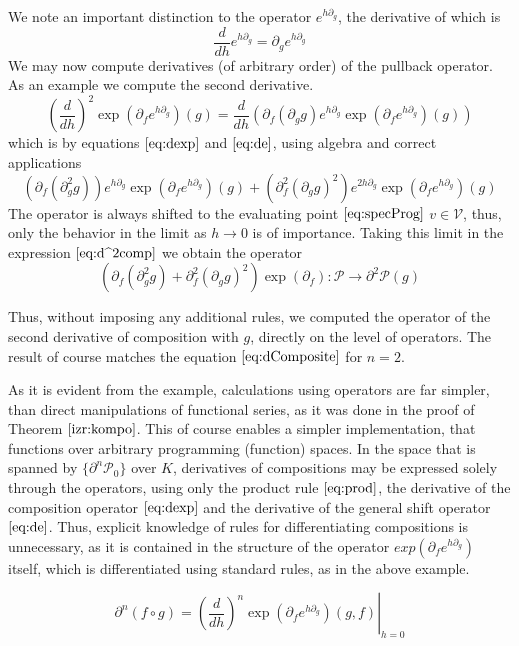 \documentclass[smallcondensed]{svjour3}
\newcommand{\VV}{\mathcal{V}}
\newcommand{\dP}{\mathcal{P}}
\newcommand{\D}{\partial}
\begin{document}
 We note an important distinction to the operator $e^{h\D_g}$, the derivative of which is
 \begin{equation}\label{eq:de}
\frac{d}{dh}e^{h\D_g}=\D_ge^{h\D_g}
 \end{equation}
 We may now compute derivatives (of arbitrary order) of the pullback operator. As an example we compute the second derivative.
 $$\left(\frac{d}{dh}\right)^2\exp\left(\D_fe^{h\D_g}\right)(g)=\frac{d}{dh}\left(\D_f(\D_gg)e^{h\D_g}\exp\left(\D_fe^{h\D_g}\right)(g)\right)$$
 which is by equations $\eqref{eq:dexp}$ and $\eqref{eq:de}$, using algebra and correct applications
 \begin{equation}\label{eq:d^2comp}
 \left(\D_f(\D^2_gg)\right)e^{h\D_g}\exp(\D_fe^{h\D_g})(g)+(\D^2_f(\D_gg)^2)e^{2h\D_g}\exp(\D_fe^{h\D_g})(g)
 \end{equation}
 The operator is always shifted to the evaluating point $\eqref{eq:specProg}$ $v\in \VV$, thus, only the behavior in the limit as $h\to 0$ is of importance. Taking this limit in the expression $\eqref{eq:d^2comp}$ we obtain the operator
 \begin{equation}
	\left(\D_f(\D^2_gg)+\D^2_f(\D_gg)^2\right)\exp(\D_f):\dP\to\D^2\dP(g)
 \end{equation}
 
 Thus, without imposing any additional rules, we computed the operator of the second derivative of composition with $g$, directly on the level of operators. The result of course matches the equation $\eqref{eq:dComposite}$ for $n=2$.
 
 As it is evident from the example, calculations using operators are far
 simpler, than direct manipulations of functional series, as it was done in the
 proof of Theorem $\ref{izr:kompo}$. This of course enables a simpler
 implementation, that functions over arbitrary programming (function) spaces. In
 the space that is spanned by $\{\D^n\dP_0\}$ over $K$, derivatives of
 compositions may be expressed solely through the operators, using only the
 product rule $\eqref{eq:prod}$, the derivative of the composition operator
 $\eqref{eq:dexp}$ and the derivative of the general shift operator
 $\eqref{eq:de}$. Thus, explicit knowledge of rules for differentiating
 compositions is unnecessary, as it is contained in the structure of the
 operator $exp(\D_fe^{h\D_g})$ itself, which is differentiated using standard
 rules, as in the above example. 
 
 \begin{equation}\label{eq:dkompo}
 \D^n(f\circ g)=\left.\left(\frac{d}{dh}\right)^n\exp\left(\D_fe^{h\D_g}\right)(g,f)\right|_{h=0}
 \end{equation}
 
\end{document}

